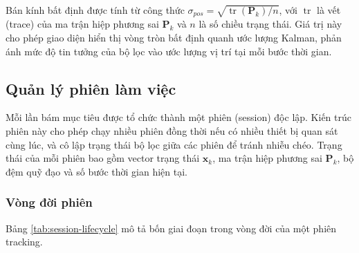 Bán kính bất định được tính từ công thức $\sigma_{pos} = \sqrt{\operatorname{tr}(\mathbf{P}_k)/n}$, với $\operatorname{tr}$ là vết (trace) của ma trận hiệp phương sai $\mathbf{P}_k$ và $n$ là số chiều trạng thái. Giá trị này cho phép giao diện hiển thị vòng tròn bất định quanh ước lượng Kalman, phản ánh mức độ tin tưởng của bộ lọc vào ước lượng vị trí tại mỗi bước thời gian.

\subsection{Quản lý phiên làm việc}

\hspace{0.5cm} Mỗi lần bám mục tiêu được tổ chức thành một phiên (session) độc lập. Kiến trúc phiên này cho phép chạy nhiều phiên đồng thời nếu có nhiều thiết bị quan sát cùng lúc, và cô lập trạng thái bộ lọc giữa các phiên để tránh nhiễu chéo. Trạng thái của mỗi phiên bao gồm vector trạng thái $\mathbf{x}_k$, ma trận hiệp phương sai $\mathbf{P}_k$, bộ đệm quỹ đạo và số bước thời gian hiện tại.

\subsubsection{Vòng đời phiên}

\hspace{0.5cm} Bảng \ref{tab:session-lifecycle} mô tả bốn giai đoạn trong vòng đời của một phiên tracking.

\begin{table}[H]
\centering
{}
\caption{Vòng đời của một phiên tracking}
\label{tab:session-lifecycle}
\end{table}

